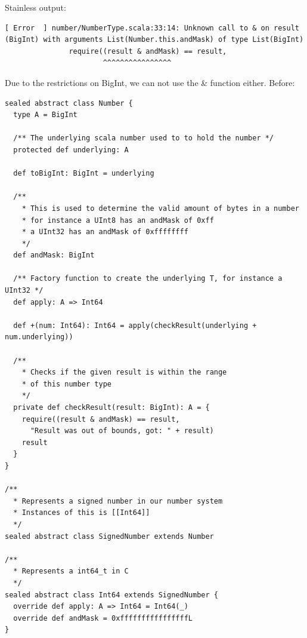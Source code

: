 \documentclass[runningheads]{llncs}
\begin{document}
Stainless output:
\begin{lstlisting}[style=stainless]
  [ Error  ] number/NumberType.scala:33:14: Unknown call to & on result (BigInt) with arguments List(Number.this.andMask) of type List(BigInt)
               require((result & andMask) == result,
                       ^^^^^^^^^^^^^^^^

\end{lstlisting}

Due to the restrictions on BigInt, we can not use the \& function either.
Before:
\begin{lstlisting}[style=scala]
sealed abstract class Number {
  type A = BigInt

  /** The underlying scala number used to to hold the number */
  protected def underlying: A

  def toBigInt: BigInt = underlying

  /**
    * This is used to determine the valid amount of bytes in a number
    * for instance a UInt8 has an andMask of 0xff
    * a UInt32 has an andMask of 0xffffffff
    */
  def andMask: BigInt

  /** Factory function to create the underlying T, for instance a UInt32 */
  def apply: A => Int64

  def +(num: Int64): Int64 = apply(checkResult(underlying + num.underlying))

  /**
    * Checks if the given result is within the range
    * of this number type
    */
  private def checkResult(result: BigInt): A = {
    require((result & andMask) == result,
      "Result was out of bounds, got: " + result)
    result
  }
}

/**
  * Represents a signed number in our number system
  * Instances of this is [[Int64]]
  */
sealed abstract class SignedNumber extends Number

/**
  * Represents a int64_t in C
  */
sealed abstract class Int64 extends SignedNumber {
  override def apply: A => Int64 = Int64(_)
  override def andMask = 0xffffffffffffffffL
}
\end{lstlisting}
\end{document}
